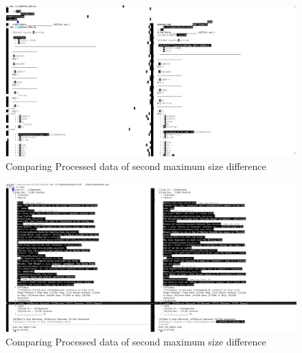\documentclass[12pt]{article}
\begin{document}
\newpage
\begin{figure}[ht]
\includegraphics[scale=0.5]{../../q4/995oldvsnew.png}
\centering
\caption{Comparing Processed data of second maximum size difference}
\label{fig:Initial graph}
\end{figure}
\newpage
\begin{figure}[ht]
\includegraphics[scale=0.5]{../../q4/554oldvsnew.png}
\centering
\caption{Comparing Processed data of second maximum size difference}
\label{fig:Initial graph}
\end{figure}

\newpage
{}






\newpage







\cite{*}
\end{document}
